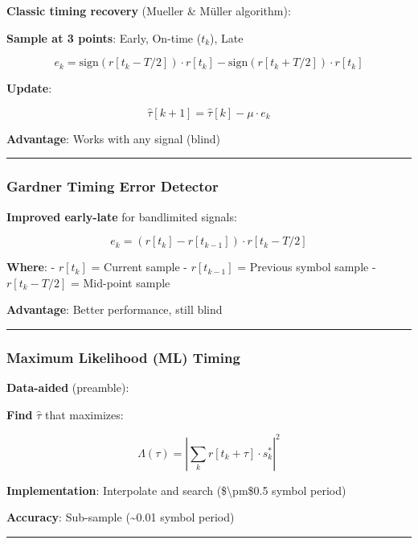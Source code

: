 \textbf{Classic timing recovery} (Mueller \& Müller algorithm):

\textbf{Sample at 3 points}: Early, On-time (\(t_k\)), Late

\[
e_k = \text{sign}(r[t_k - T/2]) \cdot r[t_k] - \text{sign}(r[t_k + T/2]) \cdot r[t_k]
\]

\textbf{Update}:

\[
\hat{\tau}[k+1] = \hat{\tau}[k] - \mu \cdot e_k
\]

\textbf{Advantage}: Works with any signal (blind)

\begin{center}\rule{0.5\linewidth}{0.5pt}\end{center}

\subsubsection{Gardner Timing Error
Detector}\label{gardner-timing-error-detector}

\textbf{Improved early-late} for bandlimited signals:

\[
e_k = (r[t_k] - r[t_{k-1}]) \cdot r[t_k - T/2]
\]

\textbf{Where}: - \(r[t_k]\) = Current sample - \(r[t_{k-1}]\) =
Previous symbol sample - \(r[t_k - T/2]\) = Mid-point sample

\textbf{Advantage}: Better performance, still blind

\begin{center}\rule{0.5\linewidth}{0.5pt}\end{center}

\subsubsection{Maximum Likelihood (ML)
Timing}\label{maximum-likelihood-ml-timing}

\textbf{Data-aided} (preamble):

\textbf{Find} \(\hat{\tau}\) that maximizes:

\[
\Lambda(\tau) = \left|\sum_{k} r[t_k + \tau] \cdot s_k^*\right|^2
\]

\textbf{Implementation}: Interpolate and search
(\$\textbackslash pm\$0.5 symbol period)

\textbf{Accuracy}: Sub-sample (\textasciitilde0.01 symbol period)

\begin{center}\rule{0.5\linewidth}{0.5pt}\end{center}

